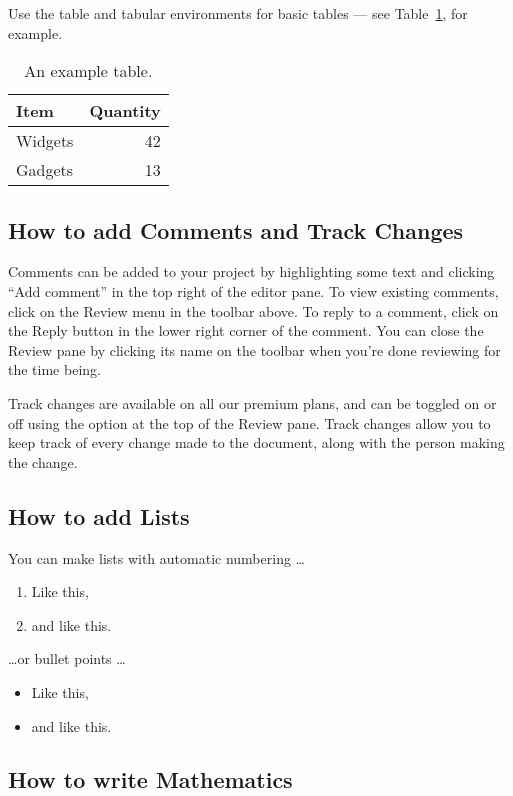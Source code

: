 \documentclass{article}
\begin{document}
Use the table and tabular environments for basic tables --- see Table~\ref{tab:widgets}, for example.

\begin{table}
\centering
\begin{tabular}{l|r}
Item & Quantity \\\hline
Widgets & 42 \\
Gadgets & 13
\end{tabular}
\caption{\label{tab:widgets}An example table.}
\end{table}

\subsection{How to add Comments and Track Changes}

Comments can be added to your project by highlighting some text and clicking ``Add comment'' in the top right of the editor pane. To view existing comments, click on the Review menu in the toolbar above. To reply to a comment, click on the Reply button in the lower right corner of the comment. You can close the Review pane by clicking its name on the toolbar when you're done reviewing for the time being.

Track changes are available on all our premium plans, and can be toggled on or off using the option at the top of the Review pane. Track changes allow you to keep track of every change made to the document, along with the person making the change.

\subsection{How to add Lists}

You can make lists with automatic numbering \dots

\begin{enumerate}
\item Like this,
\item and like this.
\end{enumerate}
\dots or bullet points \dots
\begin{itemize}
\item Like this,
\item and like this.
\end{itemize}

\subsection{How to write Mathematics}
\end{document}
